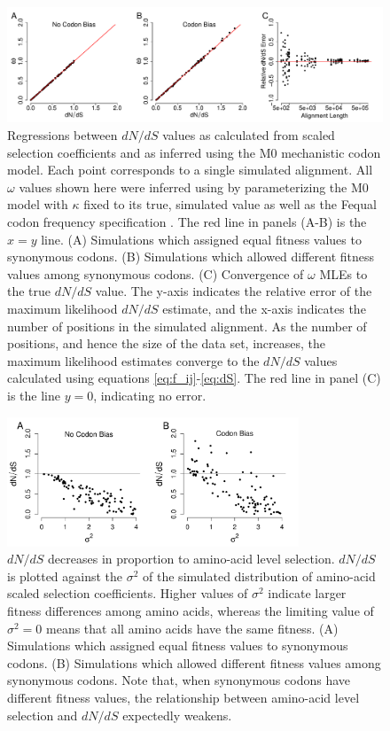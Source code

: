 \documentclass{pnastwo}
\begin{document}
\begin{figure}[H]
\centerline{\includegraphics[width=18.7cm]{figures/MainText/regression_convergence.pdf}}
\caption{\label{reg_conv} Regressions between $dN/dS$ values as calculated from scaled selection coefficients and as inferred using the M0 mechanistic codon model. Each point corresponds to a single simulated alignment. All $\omega$ values shown here were inferred using by parameterizing the M0 model with $\kappa$ fixed to its true, simulated value as well as the Fequal codon frequency specification \cite{Yang2006}. The red line in panels (A-B) is the $x=y$ line. (A) Simulations which assigned equal fitness values to synonymous codons. (B) Simulations which allowed different fitness values among synonymous codons. (C) Convergence of $\omega$ MLEs to the true $dN/dS$ value. The y-axis indicates the relative error of the maximum likelihood $dN/dS$ estimate, and the x-axis indicates the number of positions in the simulated alignment. As the number of positions, and hence the size of the data set, increases, the maximum likelihood estimates converge to the $dN/dS$ values calculated using equations \eqref{eq:f_ij}-\eqref{eq:dS}. The red line in panel (C) is the line $y=0$, indicating no error.}
\end{figure}


\bigskip
\bigskip
\bigskip
\bigskip

\begin{figure}[H]
\centerline{\includegraphics[width=8.7cm]{figures/MainText/sd_vs_dnds.pdf}}
\caption{\label{stddev_dnds} $dN/dS$ decreases in proportion to amino-acid level selection. $dN/dS$ is plotted against the $\sigma^2 $ of the simulated distribution of amino-acid scaled selection coefficients. Higher values of $\sigma^2$ indicate larger fitness differences among amino acids, whereas the limiting value of $\sigma^2 = 0$ means that all amino acids have the same fitness. (A) Simulations which assigned equal fitness values to synonymous codons. (B) Simulations which allowed different fitness values among synonymous codons. Note that, when synonymous codons have different fitness values, the relationship between amino-acid level selection and $dN/dS$ expectedly weakens.}
\end{figure}
\end{document}
